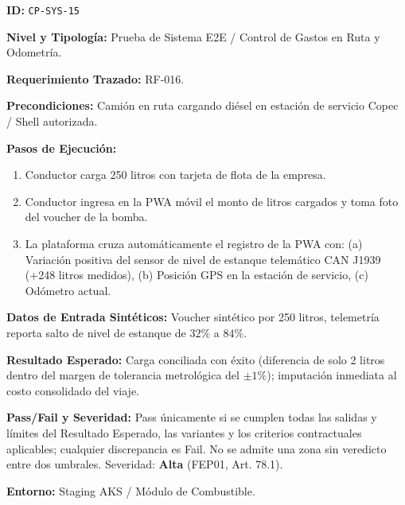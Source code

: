 \par\noindent\textbf{ID:} \texttt{C\allowbreak{}P\allowbreak{}-\allowbreak{}S\allowbreak{}Y\allowbreak{}S\allowbreak{}-\allowbreak{}1\allowbreak{}5\allowbreak{}}\par
\par\noindent\textbf{Nivel y Tipología:} Prueba de Sistema E2E / Control de Gastos en Ruta y Odometría.\par
\par\noindent\textbf{Requerimiento Trazado:} RF-016.\par
\par\noindent\textbf{Precondiciones:} Camión en ruta cargando diésel en estación de servicio Copec / Shell autorizada.\par
\par\noindent\textbf{Pasos de Ejecución:} \par
\begin{enumerate}
\item Conductor carga 250 litros con tarjeta de flota de la empresa.
\item Conductor ingresa en la PWA móvil el monto de litros cargados y toma foto del voucher de la bomba.
\item La plataforma cruza automáticamente el registro de la PWA con: (a) Variación positiva del sensor de nivel de estanque telemático CAN J1939 (+248 litros medidos), (b) Posición GPS en la estación de servicio, (c) Odómetro actual.
\end{enumerate}
\par\noindent\textbf{Datos de Entrada Sintéticos:} Voucher sintético por 250 litros, telemetría reporta salto de nivel de estanque de \(32\%\) a \(84\%\).\par
\par\noindent\textbf{Resultado Esperado:} Carga conciliada con éxito (diferencia de solo 2 litros dentro del margen de tolerancia metrológica del \(\pm 1\%\)); imputación inmediata al costo consolidado del viaje.\par
\par\noindent\textbf{Pass/Fail y Severidad:} Pass únicamente si se cumplen todas las salidas y límites del Resultado Esperado, las variantes y los criterios contractuales aplicables; cualquier discrepancia es Fail. No se admite una zona sin veredicto entre dos umbrales. Severidad: \textbf{Alta} (FEP01, Art. 78.1).\par
\par\noindent\textbf{Entorno:} Staging AKS / Módulo de Combustible.\par







